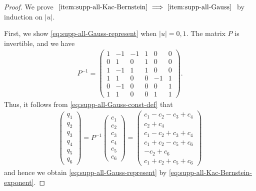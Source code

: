\documentclass[12pt]{article}
\theoremstyle{definition}
\theoremstyle{remark}
\numberwithin{equation}{section}
\numberwithin{figure}{section}
\numberwithin{table}{section}
\begin{document}
\begin{proof}

We prove $ \text{ \ref{item:supp-all-Kac-Bernstein} } \Longrightarrow \text{ \ref{item:supp-all-Gauss} } $ by induction on $ | u | $.

First, we show \eqref{eq:supp-all-Gauss-represent} when $ | u | = 0 , 1 $.
The matrix $ P $ is invertible, and we have
\begin{align}
    P^{ - 1 } =
    \begin{pmatrix}
    1 & - 1 & - 1 & 1 & 0 & 0 \\
    0 & 1 & 0 & 1 & 0 & 0 \\
    1 & - 1 & 1 & 1 & 0 & 0 \\
    1 & 1 & 0 & 0 & - 1 & 1 \\
    0 & - 1 & 0 & 0 & 0 & 1 \\
    1 & 1 & 0 & 0 & 1 & 1
  \end{pmatrix}
  .
\end{align}
Thus, it follows from \eqref{eq:supp-all-Gauss-const-def} that
\begin{align}
    \begin{pmatrix}
    q_1 \\
    q_2 \\
    q_3 \\
    q_4 \\
    q_5 \\
    q_6
  \end{pmatrix}
  = P^{ - 1 }
  \begin{pmatrix}
    c_1 \\
    c_2 \\
    c_3 \\
    c_4 \\
    c_5 \\
    c_6
  \end{pmatrix}
  =
  \begin{pmatrix}
    c_1 - c_2 - c_3 + c_4 \\
    c_2 + c_4 \\
    c_1 - c_2 + c_3 + c_4 \\
    c_1 + c_2 - c_5 + c_6 \\
    - c_2 + c_6 \\
    c_1 + c_2 + c_5 + c_6
  \end{pmatrix}
  \label{eq:supp-all-proof-inverse}
\end{align}
and hence we obtain \eqref{eq:supp-all-Gauss-represent} by \eqref{eq:supp-all-Kac-Bernstein-exponent}.


\end{proof}
\end{document}
